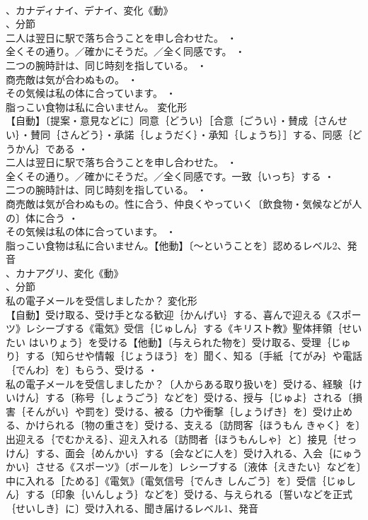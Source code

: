 \documentclass[8pt]{extreport}
\begin{document}
\begin{CJK}{UTF8}{min}
\\	、カナディナイ、デナイ、変化《動》
\\	、分節
\\	二人は翌日に駅で落ち合うことを申し合わせた。 ・
\\	全くその通り。／確かにそうだ。／全く同感です。 ・
\\	二つの腕時計は、同じ時刻を指している。 ・
\\	商売敵は気が合わぬもの。 ・
\\	その気候は私の体に合っています。 ・
\\	脂っこい食物は私に合いません。	変化形 
\\	【自動】〔提案・意見などに〕同意｛どうい｝［合意｛ごうい｝・賛成｛さんせい｝・賛同｛さんどう｝・承諾｛しょうだく｝・承知｛しょうち｝］する、同感｛どうかん｝である ・
\\	二人は翌日に駅で落ち合うことを申し合わせた。 ・
\\	全くその通り。／確かにそうだ。／全く同感です。一致｛いっち｝する ・
\\	二つの腕時計は、同じ時刻を指している。 ・
\\	商売敵は気が合わぬもの。性に合う、仲良くやっていく〔飲食物・気候などが人の〕体に合う ・
\\	その気候は私の体に合っています。 ・
\\	脂っこい食物は私に合いません。【他動】〔～ということを〕認めるレベル2、発音
\\	、カナアグリ、変化《動》
\\	、分節
\\	私の電子メールを受信しましたか？	変化形 
\\	【自動】受け取る、受け手となる歓迎｛かんげい｝する、喜んで迎える《スポーツ》レシーブする《電気》受信｛じゅしん｝する《キリスト教》聖体拝領｛せいたい はいりょう｝を受ける【他動】〔与えられた物を〕受け取る、受理｛じゅり｝する〔知らせや情報｛じょうほう｝を〕聞く、知る〔手紙｛てがみ｝や電話｛でんわ｝を〕もらう、受ける ・
\\	私の電子メールを受信しましたか？〔人からある取り扱いを〕受ける、経験｛けいけん｝する〔称号｛しょうごう｝などを〕受ける、授与｛じゅよ｝される〔損害｛そんがい｝や罰を〕受ける、被る〔力や衝撃｛しょうげき｝を〕受け止める、かけられる〔物の重さを〕受ける、支える〔訪問客｛ほうもん きゃく｝を〕出迎える｛でむかえる｝、迎え入れる〔訪問者｛ほうもんしゃ｝と〕接見｛せっけん｝する、面会｛めんかい｝する〔会などに人を〕受け入れる、入会｛にゅうかい｝させる《スポーツ》〔ボールを〕レシーブする〔液体｛えきたい｝などを〕中に入れる［ためる］《電気》〔電気信号｛でんき しんごう｝を〕受信｛じゅしん｝する〔印象｛いんしょう｝などを〕受ける、与えられる〔誓いなどを正式｛せいしき｝に〕受け入れる、聞き届けるレベル1、発音

\end{CJK}
\end{document}
